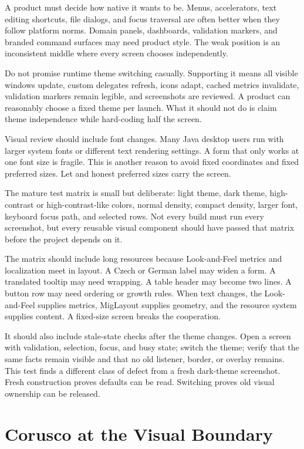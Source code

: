 A product must decide how native it wants to be. Menus, accelerators, text editing shortcuts, file dialogs, and focus traversal are often better when they follow platform norms. Domain panels, dashboards, validation markers, and branded command surfaces may need product style. The weak position is an inconsistent middle where every screen chooses independently.

Do not promise runtime theme switching casually. Supporting it means all visible windows update, custom delegates refresh, icons adapt, cached metrics invalidate, validation markers remain legible, and screenshots are reviewed. A product can reasonably choose a fixed theme per launch. What it should not do is claim theme independence while hard-coding half the screen.

Visual review should include font changes. Many Java desktop users run with larger system fonts or different text rendering settings. A form that only works at one font size is fragile. This is another reason to avoid fixed coordinates and fixed preferred sizes. Let \miglayout{} and honest preferred sizes carry the screen.

The mature test matrix is small but deliberate: light theme, dark theme, high-contrast or high-contrast-like colors, normal density, compact density, larger font, keyboard focus path, and selected rows. Not every build must run every screenshot, but every reusable visual component should have passed that matrix before the project depends on it.

The matrix should include long resources because Look-and-Feel metrics and localization meet in layout. A Czech or German label may widen a form. A translated tooltip may need wrapping. A table header may become two lines. A button row may need ordering or growth rules. When text changes, the Look-and-Feel supplies metrics, MigLayout supplies geometry, and the resource system supplies content. A fixed-size screen breaks the cooperation.

It should also include stale-state checks after the theme changes. Open a screen with validation, selection, focus, and busy state; switch the theme; verify that the same facts remain visible and that no old listener, border, or overlay remains. This test finds a different class of defect from a fresh dark-theme screenshot. Fresh construction proves defaults can be read. Switching proves old visual ownership can be released.

\section{Corusco at the Visual Boundary}

